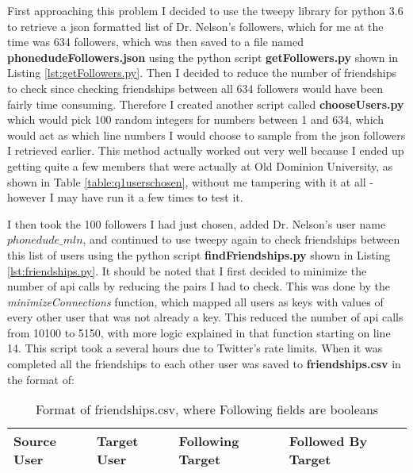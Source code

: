 \documentclass[letterpaper,11pt]{article}
\begin{document}
First approaching this problem I decided to use the tweepy library for python 3.6 to retrieve a json formatted list of Dr. Nelson's followers, which for me at the time was 634 followers, which was then saved to a file named \textbf{phonedudeFollowers.json} using the python script \textbf{getFollowers.py} shown in Listing \ref{lst:getFollowers.py}. Then I decided to reduce the number of friendships to check since checking friendships between all 634 followers would have been fairly time consuming. Therefore I created another script called \textbf{chooseUsers.py} which would pick 100 random integers for numbers between 1 and 634, which would act as which line numbers I would choose to sample from the json followers I retrieved earlier. This method actually worked out very well because I ended up getting quite a few members that were actually at Old Dominion University, as shown in Table \ref{table:q1userschosen}, without me tampering with it at all - however I may have run it a few times to test it.

I then took the 100 followers I had just chosen, added Dr. Nelson's user name $phonedude\_mln$, and continued to use tweepy again to check friendships between this list of users using the python script \textbf{findFriendships.py} shown in Listing \ref{lst:friendships.py}. It should be noted that I first decided to minimize the number of api calls by reducing the pairs I had to check. This was done by the \textit{minimizeConnections} function, which mapped all users as keys with values of every other user that was not already a key. This reduced the number of api calls from 10100 to 5150, with more logic explained in that function starting on line 14. This script took a several hours due to Twitter's rate limits. When it was completed all the friendships to each other user was saved to \textbf{friendships.csv} in the format of:

\begin{table}[htb]
\centering
\begin{tabular}{ | l | l | l | l |}
\hline
\textbf{Source User} & \textbf{Target User} & \textbf{Following Target} & \textbf{Followed By Target} \\
\hline
\end{tabular}
\caption{Format of friendships.csv, where Following fields are booleans}
\label{table:q1csvtable}
\end{table}
\end{document}
